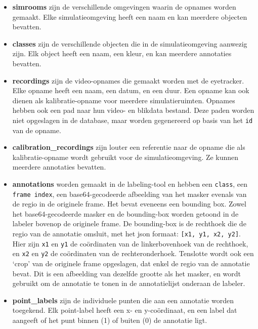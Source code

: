 \begin{itemize}
  \item \textbf{simrooms} zijn de verschillende omgevingen waarin de opnames worden gemaakt. 
  Elke simulatieomgeving heeft een naam en kan meerdere objecten bevatten.
  \item \textbf{classes} zijn de verschillende objecten die in de simulatieomgeving aanwezig zijn. 
  Elk object heeft een naam, een kleur, en kan meerdere annotaties bevatten.
  \item \textbf{recordings} zijn de video-opnames die gemaakt worden met de eyetracker. 
  Elke opname heeft een naam, een datum, en een duur. 
  Een opname kan ook dienen als kalibratie-opname voor meerdere simulatieruimten. 
  Opnames hebben ook een pad naar hun video- en blikdata bestand. 
  Deze paden worden niet opgeslagen in de database, maar worden gegenereerd op basis van het \texttt{id} van de opname. 
  \item \textbf{calibration\_recordings} zijn louter een referentie naar de opname die als kali\-bratie-opname wordt gebruikt 
  voor de simulatieomgeving. Ze kunnen meerdere annotaties bevatten.
  \item \textbf{annotations} worden gemaakt in de labeling-tool en hebben een \texttt{class}, een \texttt{frame index}, 
  een base64-gecodeerde afbeelding van het masker evenals van de regio in de originele frame. Het bevat eveneens een bounding box. Zowel het base64-gecodeerde 
  masker en de bounding-box worden getoond in de labeler bovenop de originele frame. De bounding-box is de rechthoek die de regio van de 
  annotatie omsluit, met het json formaat: \texttt{[x1, y1, x2, y2]}. Hier zijn \texttt{x1} en \texttt{y1} de coördinaten van de 
  linkerbovenhoek van de rechthoek, en \texttt{x2} en \texttt{y2} de coördinaten van de rechteronderhoek. 
  Tenslotte wordt ook een `crop' van de originele frame opgeslagen, dat enkel de regio van de annotatie bevat. 
  Dit is een afbeelding van dezelfde grootte als het masker, en wordt gebruikt om de annotatie te tonen in de annotatielijst onderaan de labeler.
  \item \textbf{point\_labels} zijn de individuele punten die aan een annotatie worden toegekend. Elk point-label heeft een x- en y-coördinaat, en een label dat aangeeft of het punt binnen (1) of buiten (0) de annotatie ligt.
\end{itemize}

